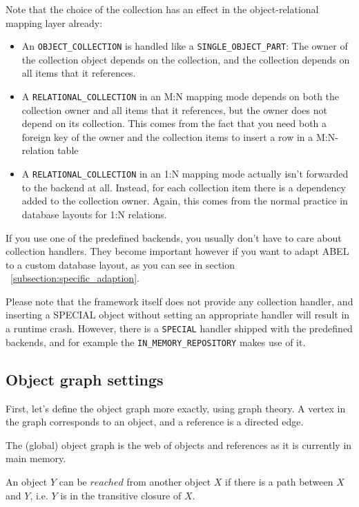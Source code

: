 Note that the choice of the collection has an effect in the object-relatio\-nal mapping layer already:
\begin{itemize}
 \item An \lstinline!OBJECT_COLLECTION! is handled like a \lstinline!SINGLE_OBJECT_PART!: The owner of the collection object depends on the collection, and the collection depends on all items that it references.
 \item A \lstinline!RELATIONAL_COLLECTION! in an M:N mapping mode depends on both the collection owner and all items that it references, but the owner does not depend on its collection.
 This comes from the fact that you need both a foreign key of the owner and the collection items to insert a row in a M:N-relation table
 \item A \lstinline!RELATIONAL_COLLECTION! in an 1:N mapping mode actually isn't forwarded to the backend at all. 
 Instead, for each collection item there is a dependency added to the collection owner.
 Again, this comes from the normal practice in database layouts for 1:N relations.
\end{itemize}


If you use one of the predefined backends, you usually don't have to care about collection handlers.
They become important however if you want to adapt ABEL to a custom database layout, as you can see in section ~\ref{subsection:specific_adaption}.

Please note that the framework itself does not provide any collection handler, and inserting a SPECIAL object without setting an appropriate handler will result in a runtime crash.
However, there is a \lstinline!SPECIAL! handler shipped with the predefined backends, and for example the \lstinline!IN_MEMORY_REPOSITORY! makes use of it.

\subsection{Object graph settings}
\label{subsection:obect_graph_settings}

First, let's define the object graph more exactly, using graph theory.
A vertex in the graph corresponds to an object, and a reference is a directed edge.

The (global) object graph is the web of objects and references as it is currently in main memory.

An object $Y$ can be $reached$ from another object $X$ if there is a path between $X$ and $Y$, i.e. $Y$ is in the transitive closure of $X$.

